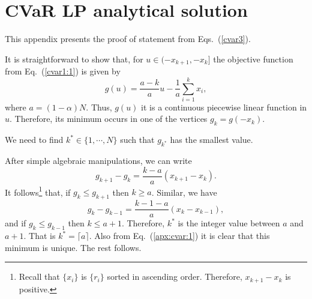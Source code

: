 
\section{CVaR LP analytical solution}\label{AppendixA}

This appendix presents the proof of statement from Eqs.~(\ref{cvar3}).

It is straightforward to show that,
for $u \in (-x_{k+1}, -x_k]$ the objective function from Eq.~(\ref{cvar1:1})
is given by
\begin{equation}
    g(u) = \frac{a-k}{a} u - \frac{1}{a} \sum_{i=1}^k x_i,
    \label{a:cavr1}
\end{equation}
where $a=(1-\alpha)N$. Thus, $g(u)$ it is a continuous piecewise linear function in $u$. Therefore,
its minimum occurs in one of the vertices $g_k= g(-x_k)$.

We need to find $k^* \in \{1,\cdots,N\}$  such that $g_{k^*}$ has the smallest value.

After simple algebraic manipulations, we can write
\begin{equation}
    g_{k+1} - g_{k} = \frac{k - a}{a} (x_{k+1} - x_{k}).
    \label{apx:cvar:1}
\end{equation}
It follows\footnote{Recall that $\{x_i\}$ is $\{r_i\}$ sorted in ascending order. Therefore, $x_{k+1} - x_{k}$ is positive.}
that, if $g_k \leq g_{k+1}$ then $k \geq a$.
Similar, we have
\begin{equation}
    g_{k} - g_{k-1} = \frac{k - 1 - a}{a} (x_{k} - x_{k-1}),
\end{equation}
and if $g_k \leq g_{k-1}$ then $k \leq a + 1$.
Therefore, $k^*$ is the integer value between $a$ and $a+1$.
That is $k^* = \lceil a \rceil$. Also from Eq.~(\ref{apx:cvar:1}) it is clear that this minimum is unique.
The rest follows.

\BackToContents


